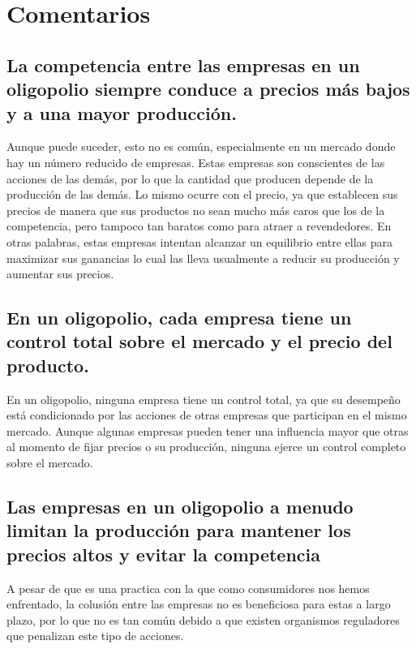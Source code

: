 \documentclass[
	spanish, %
	letterpaper, oneside
]{article}
\begin{document}
	
\templatePagecfg


\section{Comentarios}\label{sec:Comentarios}

\subsection{La competencia entre las empresas en un oligopolio siempre conduce a precios más bajos y a una mayor producción.}
Aunque puede suceder, esto no es común, especialmente en un mercado donde hay un número reducido de empresas. Estas empresas son conscientes de las acciones de las demás, por lo que la cantidad que producen depende de la producción de las demás. Lo mismo ocurre con el precio, ya que establecen sus precios de manera que sus productos no sean mucho más caros que los de la competencia, pero tampoco tan baratos como para atraer a revendedores. En otras palabras, estas empresas intentan alcanzar un equilibrio entre ellas para maximizar sus ganancias lo cual las lleva usualmente a reducir su producción y aumentar sus precios.

\subsection{En un oligopolio, cada empresa tiene un control total sobre el mercado y el precio del producto.}
En un oligopolio, ninguna empresa tiene un control total, ya que su desempeño está condicionado por las acciones de otras empresas que participan en el mismo mercado. Aunque algunas empresas pueden tener una influencia mayor que otras al momento de fijar precios o su producción, ninguna ejerce un control completo sobre el mercado.

\subsection{Las empresas en un oligopolio a menudo limitan la producción para mantener los precios altos y evitar la competencia}
A pesar de que es una practica con la que como consumidores nos hemos enfrentado, la colusión entre las empresas no es beneficiosa para estas a largo plazo, por lo que no es tan común debido a que existen organismos reguladores que penalizan este tipo de acciones.
\end{document}
